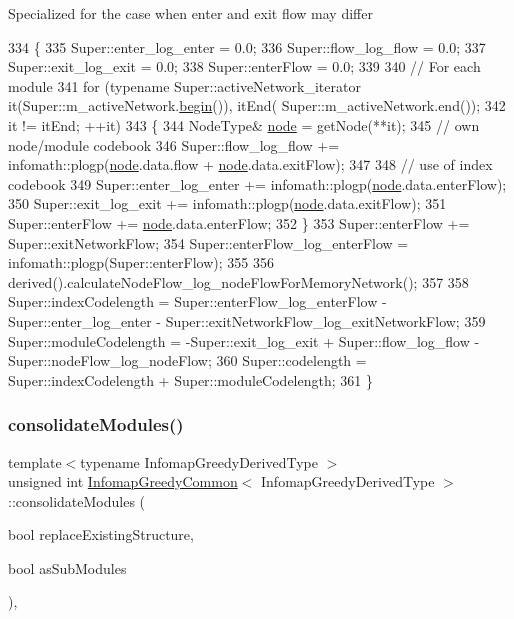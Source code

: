 Specialized for the case when enter and exit flow may differ 
\begin{DoxyCode}
334 \{
335     Super::enter\_log\_enter = 0.0;
336     Super::flow\_log\_flow = 0.0;
337     Super::exit\_log\_exit = 0.0;
338     Super::enterFlow = 0.0;
339 
340     \textcolor{comment}{// For each module}
341     \textcolor{keywordflow}{for} (\textcolor{keyword}{typename} Super::activeNetwork\_iterator it(Super::m\_activeNetwork.\mbox{\hyperlink{namespacebegin}{begin}}()), itEnd(
      Super::m\_activeNetwork.end());
342             it != itEnd; ++it)
343     \{
344         NodeType& \mbox{\hyperlink{structnode}{node}} = getNode(**it);
345         \textcolor{comment}{// own node/module codebook}
346         Super::flow\_log\_flow += infomath::plogp(\mbox{\hyperlink{structnode}{node}}.data.flow + \mbox{\hyperlink{structnode}{node}}.data.exitFlow);
347 
348         \textcolor{comment}{// use of index codebook}
349         Super::enter\_log\_enter += infomath::plogp(\mbox{\hyperlink{structnode}{node}}.data.enterFlow);
350         Super::exit\_log\_exit += infomath::plogp(\mbox{\hyperlink{structnode}{node}}.data.exitFlow);
351         Super::enterFlow += \mbox{\hyperlink{structnode}{node}}.data.enterFlow;
352     \}
353     Super::enterFlow += Super::exitNetworkFlow;
354     Super::enterFlow\_log\_enterFlow = infomath::plogp(Super::enterFlow);
355 
356     derived().calculateNodeFlow\_log\_nodeFlowForMemoryNetwork();
357 
358     Super::indexCodelength = Super::enterFlow\_log\_enterFlow - Super::enter\_log\_enter - 
      Super::exitNetworkFlow\_log\_exitNetworkFlow;
359     Super::moduleCodelength = -Super::exit\_log\_exit + Super::flow\_log\_flow - Super::nodeFlow\_log\_nodeFlow;
360     Super::codelength = Super::indexCodelength + Super::moduleCodelength;
361 \}
\end{DoxyCode}
\mbox{\label{classInfomapGreedyCommon_ad4845dbd57d006f5220e6a7d9f293f9d}} 
\subsubsection{\texorpdfstring{consolidate\+Modules()}{consolidateModules()}}
{\footnotesize\ttfamily template$<$typename Infomap\+Greedy\+Derived\+Type $>$ \\
unsigned int \mbox{\hyperlink{classInfomapGreedyCommon}{Infomap\+Greedy\+Common}}$<$ Infomap\+Greedy\+Derived\+Type $>$\+::consolidate\+Modules (\begin{DoxyParamCaption}\item[{bool}]{replace\+Existing\+Structure,  }\item[{bool}]{as\+Sub\+Modules }\end{DoxyParamCaption})\hspace{0.3cm}{\ttfamily [protected]}, {\ttfamily [virtual]}}

